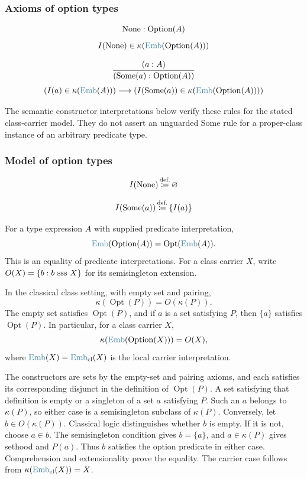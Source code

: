 \subsubsection{Axioms of option types}
\begin{axiom}[None--ax]
\[
\mathrm{None}:\mathrm{Option}(A)
\]
\[
I(\None)\in\kappa(\Emb(\Option(A)))
\]
\end{axiom}
\begin{axiom}[Some--ax]
\[
\frac{(a:A)}{(\mathrm{Some}(a):\mathrm{Option}(A))}
\]
\[
(I(a)\in \kappa(\Emb(A)))\implies(I(\Some(a))\in\kappa(\Emb(\Option(A))))
\]
\end{axiom}
The semantic constructor interpretations below verify these rules for the
stated class-carrier model. They do not assert an unguarded Some rule for
a proper-class instance of an arbitrary predicate type.
\subsubsection{Model of option types}
\begin{definition}
\[
I(\mathrm{None}) \,{\stackrel{{\textrm{def.}}}{\coloneqq}}\, \varnothing
\]
\end{definition}
\begin{definition}
\[
I(\mathrm{Some}(a)) \,{\stackrel{{\textrm{def.}}}{\coloneqq}}\, \{I(a)\}
\]
\end{definition}
\begin{definition}
For a type expression $A$ with supplied predicate interpretation,
\[
\Emb(\Option(A))=\operatorname{Opt}(\Emb(A)).
\]
This is an equality of predicate interpretations. For a class carrier
$X$, write $O(X)=\{b:b\mathrm{\ sss\ } X\}$ for its semisingleton extension.
\end{definition}

\begin{proposition}
In the classical class setting, with empty set and pairing,
\[
\kappa(\operatorname{Opt}(P))=O(\kappa(P)).
\]
The empty set satisfies $\operatorname{Opt}(P)$, and if $a$ is a set
satisfying $P$, then $\{a\}$ satisfies $\operatorname{Opt}(P)$.
In particular, for a class carrier $X$,
\[
\kappa(\Emb(\Option(X)))=O(X),
\]
where $\Emb(X)=\Emb_{\mathrm{cl}}(X)$ is the local carrier interpretation.
\end{proposition}
\Proof
The constructors are sets by the empty-set and pairing axioms, and each
satisfies its corresponding disjunct in the definition of
$\operatorname{Opt}(P)$. A set satisfying that definition is empty or
a singleton of a set $a$ satisfying $P$. Such an $a$ belongs to
$\kappa(P)$, so either case is a semisingleton subclass of $\kappa(P)$.
Conversely, let $b\in O(\kappa(P))$. Classical logic distinguishes
whether $b$ is empty. If it is not, choose $a\in b$. The semisingleton
condition gives $b=\{a\}$, and $a\in\kappa(P)$ gives sethood and
$P(a)$. Thus $b$ satisfies the option predicate in either case.
Comprehension and extensionality prove the equality. The carrier case
follows from $\kappa(\Emb_{\mathrm{cl}}(X))=X$.
\Done

